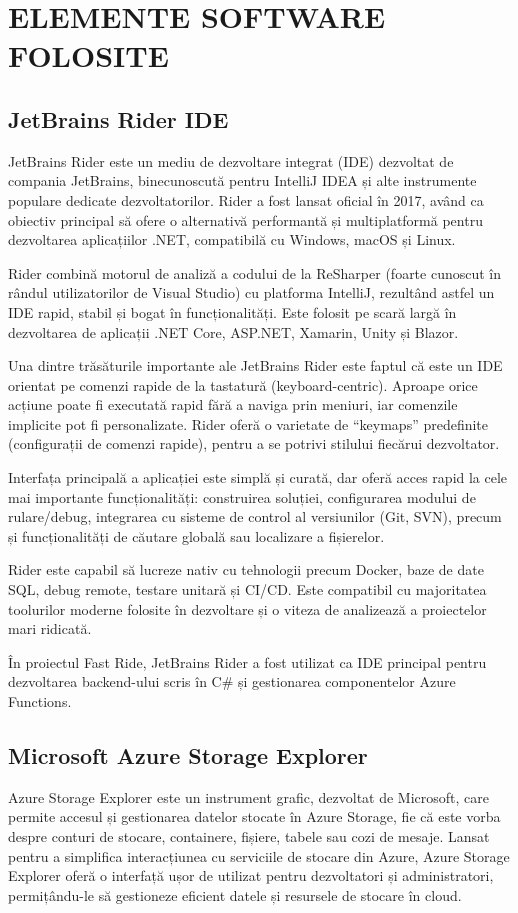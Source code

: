 \chapter {ELEMENTE SOFTWARE FOLOSITE}
\section{JetBrains Rider IDE}

JetBrains Rider este un mediu de dezvoltare integrat (IDE) dezvoltat de compania JetBrains, binecunoscută pentru IntelliJ IDEA și alte instrumente populare dedicate dezvoltatorilor. Rider a fost lansat oficial în 2017, având ca obiectiv principal să ofere o alternativă performantă și multiplatformă pentru dezvoltarea aplicațiilor .NET, compatibilă cu Windows, macOS și Linux. \parencite{rider}

Rider combină motorul de analiză a codului de la ReSharper (foarte cunoscut în rândul utilizatorilor de Visual Studio) cu platforma IntelliJ, rezultând astfel un IDE rapid, stabil și bogat în funcționalități. Este folosit pe scară largă în dezvoltarea de aplicații .NET Core, ASP.NET, Xamarin, Unity și Blazor. \parencite{rider}

Una dintre trăsăturile importante ale JetBrains Rider este faptul că este un IDE orientat pe comenzi rapide de la tastatură (keyboard-centric). Aproape orice acțiune poate fi executată rapid fără a naviga prin meniuri, iar comenzile implicite pot fi personalizate. Rider oferă o varietate de “keymaps” predefinite (configurații de comenzi rapide), pentru a se potrivi stilului fiecărui dezvoltator. \parencite{rider}

Interfața principală a aplicației este simplă și curată, dar oferă acces rapid la cele mai importante funcționalități: construirea soluției, configurarea modului de rulare/debug, integrarea cu sisteme de control al versiunilor (Git, SVN), precum și funcționalități de căutare globală sau localizare a fișierelor. \parencite{rider}

Rider este capabil să lucreze nativ cu tehnologii precum Docker, baze de date SQL, debug remote, testare unitară și CI/CD. Este compatibil cu majoritatea toolurilor moderne folosite în dezvoltare și o viteza de analizează a proiectelor mari ridicată. \parencite{rider}

În proiectul Fast Ride, JetBrains Rider a fost utilizat ca IDE principal pentru dezvoltarea backend-ului scris în C\# și gestionarea componentelor Azure Functions.

\section{Microsoft Azure Storage Explorer}
Azure Storage Explorer este un instrument grafic, dezvoltat de Microsoft, care permite
accesul și gestionarea datelor stocate în Azure Storage, fie că este vorba despre conturi de stocare,
containere, fișiere, tabele sau cozi de mesaje. Lansat pentru a simplifica interacțiunea cu serviciile
de stocare din Azure, Azure Storage Explorer oferă o interfață ușor de utilizat pentru dezvoltatori
și administratori, permițându-le să gestioneze eficient datele și resursele de stocare în cloud. \parencite{azureStorageExplorer}

